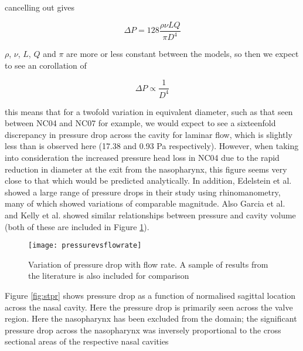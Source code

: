 cancelling out gives

\begin{equation}
  \Delta P = 128 \frac{\rho \nu L Q}{\pi D^4}
\end{equation}

$\rho$, $\nu$, $L$, $Q$ and $\pi$ are more or less constant between the models, so then we expect to see an corollation of

\begin{equation} \label{corollation}
  \Delta P \propto \frac{1}{D^4}
\end{equation}

this means that for a twofold variation in equivalent diameter, such as that seen between NC04 and NC07 for example, we would expect to see a sixteenfold discrepancy in pressure drop across the cavity for laminar flow, which is slightly less than is observed here (17.38 and 0.93 Pa respectively). However, when taking into consideration the increased pressure head loss in NC04 due to the rapid reduction in diameter at the exit from the nasopharynx, this figure seems very close to that which would be predicted analytically.
In addition, Edelstein et al. \cite{Edelstein1996} showed a large range of pressure drops in their study using rhinomanometry, many of which showed variations of comparable magnitude. Also Garcia et al. \cite{Garcia2007} and Kelly et al. \cite{Kelly2004} showed similar relationships between pressure and cavity volume (both of these are included in Figure \ref{tab:pvv}).

  \begin{figure} 
    \texttt{[image: pressurevsflowrate]}
      \caption{Variation of pressure drop with flow rate. A sample of results from the literature is also included for comparison}
  \label{tab:pvv}
\end{figure}

%

Figure \ref{fig:stpr} shows pressure drop as a function of normalised sagittal location across the nasal cavity. Here the pressure drop is primarily seen across the valve region. Here the nasopharynx has been excluded from the domain; the significant pressure drop across the nasopharynx was inversely proportional to the cross sectional areas of the respective nasal cavities


